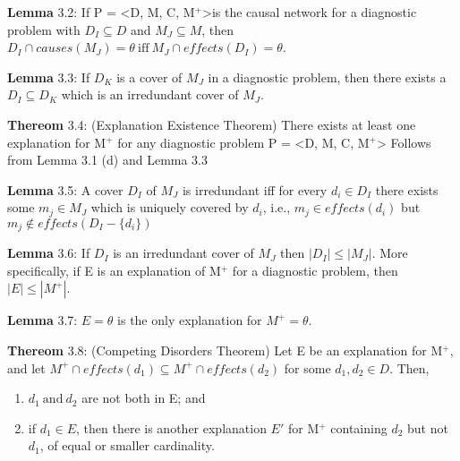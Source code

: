 \documentclass{article}
\begin{document}
\par 
\textbf{Lemma} 3.2: If P = \textless D, M, C, M$^{+}$\textgreater is the causal
network for a diagnostic problem with $D_I \subseteq D$ and $M_J \subseteq M$,
then $D_I \cap causes(M_J) = \theta\ \text{iff}\ M_J \cap effects(D_I) =
\theta$.
\newline

\par 
\textbf{Lemma} 3.3: If $D_K$ is a cover of $M_J$ in a diagnostic problem, then
there exists a $D_I \subseteq D_K$ which is an irredundant cover of $M_J$.
\newline

\par 
\textbf{Thereom} 3.4: (Explanation Existence Theorem) There exists at least one
explanation for M$^{+}$ for any diagnostic problem P = \textless D, M, C,
M$^{+}$\textgreater
\newline
Follows from Lemma 3.1 (d) and Lemma 3.3
\newline

\par 
\textbf{Lemma} 3.5: A cover $D_I$ of $M_J$ is irredundant iff for every $d_i
\in D_I$ there exists some $m_j \in M_J$ which is uniquely covered by $d_i$,
i.e., $m_j \in effects(d_i)$ but $m_j \not\in effects(D_I - \{d_i\} )$
\newline

\par 
\textbf{Lemma} 3.6: If $D_I$ is an irredundant cover of $M_J$ then $|D_I| \leq
|M_J|$. More specifically, if E is an explanation of M$^{+}$ for a diagnostic
problem, then $|E| \leq |M^{+}|$.
\newline

\par 
\textbf{Lemma} 3.7: $E = \theta$ is the only explanation for $M^{+} = \theta$.
\newline

\par 
\textbf{Thereom} 3.8: (Competing Disorders Theorem) Let E be an explanation for
M$^{+}$, and let $M^{+} \cap effects(d_1) \subseteq M^{+} \cap effects(d_2)$ for
some $d_1, d_2 \in D$. Then, 
\begin{enumerate}
  \item $d_1\ \text{and}\ d_2$ are not both in E; and
  \item if $d_1 \in E$, then there is another explanation $E'$ for M$^{+}$
  containing $d_2$ but not $d_1$, of equal or smaller cardinality.
\end{enumerate}
\end{document}
